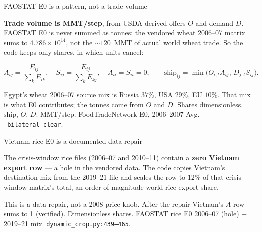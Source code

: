 \begin{frame}{FAOSTAT E0 is a pattern, not a trade volume}

\textbf{Trade volume is MMT/step}, from USDA-derived offers $O$ and demand
$D$. FAOSTAT E0 is never summed as tonnes: the vendored wheat 2006--07
matrix sums to $4.786\times 10^{14}$, not the $\sim 120$~MMT of actual
world wheat trade. So the code keeps only shares, in which units cancel:

{\small
\[
A_{ij} = \frac{E_{ij}}{\sum_k E_{ik}}, \quad
S_{ij} = \frac{E_{ij}}{\sum_k E_{kj}}, \quad A_{ii}=S_{ii}=0,
\qquad
\mathrm{ship}_{ij}
= \min\bigl(O_{i,t}\tilde A_{ij},\, D_{j,t} S_{ij}\bigr).
\]}

Egypt's wheat 2006--07 source mix is Russia $37\%$, USA $29\%$, EU $10\%$.
That mix is what E0 contributes; the tonnes come from $O$ and $D$.
{Shares dimensionless. $\mathrm{ship}$, $O$, $D$: MMT/step.}
{FoodTradeNetwork E0, 2006--2007 Avg. \texttt{\_bilateral\_clear}.}
\end{frame}

\begin{frame}{Vietnam rice E0 is a documented data repair}

The crisis-window rice files (2006--07 and 2010--11) contain a
\textbf{zero Vietnam export row} --- a hole in the vendored data. The code
copies Vietnam's destination mix from the 2019--21 file and scales the row
to 12\% of that crisis-window matrix's total, an order-of-magnitude world
rice-export share.

This is a data repair, not a 2008 price knob. After the repair Vietnam's
$A$ row sums to 1 (verified).
{Dimensionless shares.}
{FAOSTAT rice E0 2006--07 (hole) + 2019--21 mix.
\texttt{dynamic\_crop.py:439--465}.}
\end{frame}

